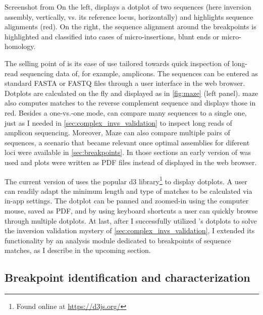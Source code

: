     {Screenshot from \maze}
    {On the left, \maze displays a dotplot of two sequences (here inversion
    assembly, vertically, vs. its reference locus, horizontally) and highlights
    sequence alignments (red). On the right, the sequence alignment around the
    breakpoints is highlighted and classified into cases of micro-insertions,
    blunt ends or micro-homology.}

The selling point of \maze is its ease of use tailored towards quick inspection
of long-read sequencing data of, for example, amplicons. The sequences can be
entered as standard FASTA or FASTQ files through a user interface in the web
browser. Dotplots are calculated on the fly and displayed as in \cref{fig:maze}
(left panel). \Ac{maze} also computes matches to the reverse complement sequence
and displays those in red. Besides a one-vs.-one mode, \maze can compare many
sequences to a single one, just as I needed in \cref{sec:complex_invs_validation}
to inspect long reads of amplicon sequencing. Moreover, Maze can also compare
multiple pairs of sequences, a scenario that became relevant once optimal
assemblies for diferent loci were available in \cref{sec:breakpoints}. In those
sections an early version of \maze was used and plots were written as PDF files
instead of displayed in the web browser.

The current version of \maze uses the popular d3 library\footnote{Found online
at \url{https://d3js.org/}} to display dotplots. A user can readily adapt the
minimum length and type of matches to be calculated via in-app settings. The
dotplot can be panned and zoomed-in using the computer mouse, saved as PDF, and
by using keyboard shortcuts a user can quickly browse through multiple dotplots.
At last, after I successfully utilized \maze’s dotplots to solve the inversion
validation mystery of \cref{sec:complex_invs_validation}, I extended its
functionality by an analysis module dedicated to breakpoints of sequence
matches, as I describe in the upcoming section.





\subsection{Breakpoint identification and characterization}
\label{sec:maze_breakpoints}

